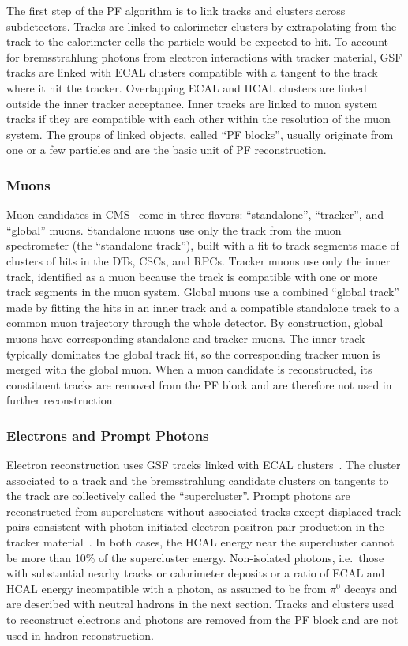 The first step of the PF algorithm is to link tracks and clusters across subdetectors.
Tracks are linked to calorimeter clusters by extrapolating from the track to the calorimeter cells the particle would be expected to hit.
To account for bremsstrahlung photons from electron interactions with tracker material, GSF tracks are linked with ECAL clusters compatible with a tangent to the track where it hit the tracker.
Overlapping ECAL and HCAL clusters are linked outside the inner tracker acceptance.
Inner tracks are linked to muon system tracks if they are compatible with each other within the resolution of the muon system.
The groups of linked objects, called ``PF blocks'', usually originate from one or a few particles and are the basic unit of PF reconstruction.

\subsubsection{Muons}

Muon candidates in CMS~\cite{Chatrchyan:2012xi} come in three flavors: ``standalone'', ``tracker'', and ``global'' muons.
Standalone muons use only the track from the muon spectrometer (the ``standalone track''), built with a fit to track segments made of clusters of hits in the DTs, CSCs, and RPCs.
Tracker muons use only the inner track, identified as a muon because the track is compatible with one or more track segments in the muon system.
Global muons use a combined ``global track'' made by fitting the hits in an inner track and a compatible standalone track to a common muon trajectory through the whole detector.
By construction, global muons have corresponding standalone and tracker muons.
The inner track typically dominates the global track fit, so the corresponding tracker muon is merged with the global muon.
When a muon candidate is reconstructed, its constituent tracks are removed from the PF block and are therefore not used in further reconstruction.

\subsubsection{Electrons and Prompt Photons}

Electron reconstruction uses GSF tracks linked with ECAL clusters~\cite{Baffioni:2006cd,Adam:2005bya}.
The cluster associated to a track and the bremsstrahlung candidate clusters on tangents to the track are collectively called the ``supercluster''.
Prompt photons are reconstructed from superclusters without associated tracks except displaced track pairs consistent with photon-initiated electron-positron pair production in the tracker material~\cite{Khachatryan:2015iwa}.
In both cases, the HCAL energy near the supercluster cannot be more than 10\% of the supercluster energy.
Non-isolated photons, i.e.\ those with substantial nearby tracks or calorimeter deposits or a ratio of ECAL and HCAL energy incompatible with a photon, as assumed to be from $\pi^0$ decays and are described with neutral hadrons in the next section.
Tracks and clusters used to reconstruct electrons and photons are removed from the PF block and are not used in hadron reconstruction.


